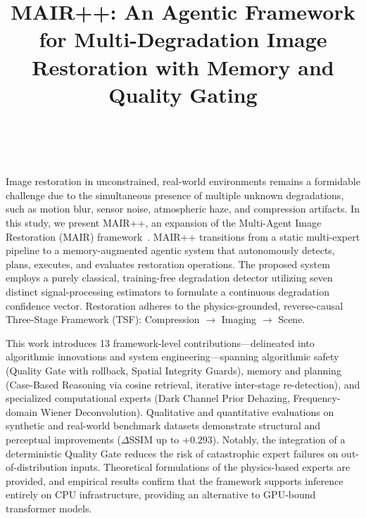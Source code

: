 \documentclass[journal, 10pt]{IEEEtran}
\begin{document}
\title{MAIR++: An Agentic Framework for Multi-Degradation Image Restoration with Memory and Quality Gating}

\author{
    \\
}

\maketitle

Image restoration in unconstrained, real-world environments remains a formidable challenge due to the simultaneous presence of multiple unknown degradations, such as motion blur, sensor noise, atmospheric haze, and compression artifacts. In this study, we present MAIR++, an expansion of the Multi-Agent Image Restoration (MAIR) framework~\cite{jiang2026mair}. MAIR++ transitions from a static multi-expert pipeline to a memory-augmented agentic system that autonomously detects, plans, executes, and evaluates restoration operations. The proposed system employs a purely classical, training-free degradation detector utilizing seven distinct signal-processing estimators to formulate a continuous degradation confidence vector. Restoration adheres to the physics-grounded, reverse-causal Three-Stage Framework (TSF): Compression $\to$ Imaging $\to$ Scene. 

This work introduces 13 framework-level contributions—delineated into algorithmic innovations and system engineering—spanning algorithmic safety (Quality Gate with rollback, Spatial Integrity Guards), memory and planning (Case-Based Reasoning via cosine retrieval, iterative inter-stage re-detection), and specialized computational experts (Dark Channel Prior Dehazing, Frequency-domain Wiener Deconvolution). Qualitative and quantitative evaluations on synthetic and real-world benchmark datasets demonstrate structural and perceptual improvements ($\Delta$SSIM up to $+0.293$). Notably, the integration of a deterministic Quality Gate reduces the risk of catastrophic expert failures on out-of-distribution inputs. Theoretical formulations of the physics-based experts are provided, and empirical results confirm that the framework supports inference entirely on CPU infrastructure, providing an alternative to GPU-bound transformer models.
\end{document}
